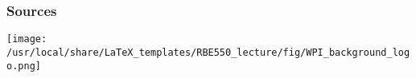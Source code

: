 

\begin{frame}[allowframebreaks,label=bibliography]
    \frametitle{Sources}

    
    

\end{frame}



\begin{frame}[label=finalframe]
 

\begin{center}
\texttt{[image: /usr/local/share/LaTeX\_templates/RBE550\_lecture/fig/WPI\_background\_logo.png]}
\end{center}

\end{frame}

 


